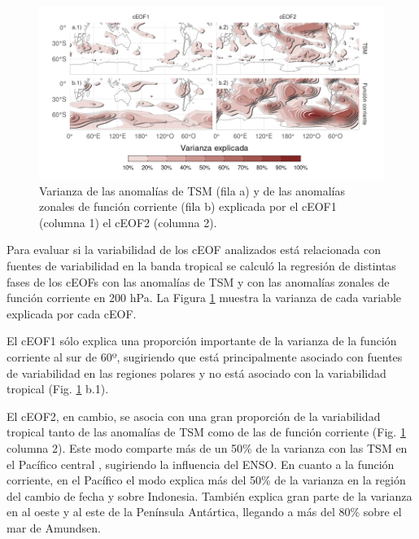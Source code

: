 \documentclass[12pt,oneside,a4paper]{reedthesis}
\begin{document}
\begin{figure}

{\centering \includegraphics{figures/20-ceofs/psi-sst-explained-variance-1} 

}

\caption{Varianza de las anomalías de TSM (fila a) y de las anomalías zonales de función corriente (fila b) explicada por el cEOF1 (columna 1) el cEOF2 (columna 2).}\label{fig:psi-sst-explained-variance}
\end{figure}

Para evaluar si la variabilidad de los cEOF analizados está relacionada con fuentes de variabilidad en la banda tropical se calculó la regresión de distintas fases de los cEOFs con las anomalías de TSM y con las anomalías zonales de función corriente en 200 hPa.
La Figura \ref{fig:psi-sst-explained-variance} muestra la varianza de cada variable explicada por cada cEOF.

El cEOF1 sólo explica una proporción importante de la varianza de la función corriente al sur de 60º, sugiriendo que está principalmente asociado con fuentes de variabilidad en las regiones polares y no está asociado con la variabilidad tropical (Fig. \ref{fig:psi-sst-explained-variance} b.1).

El cEOF2, en cambio, se asocia con una gran proporción de la variabilidad tropical tanto de las anomalías de TSM como de las de función corriente (Fig. \ref{fig:psi-sst-explained-variance} columna 2).
Este modo comparte más de un 50\% de la varianza con las TSM en el Pacífico central , sugiriendo la influencia del ENSO.
En cuanto a la función corriente, en el Pacífico el modo explica más del 50\% de la varianza en la región del cambio de fecha y sobre Indonesia.
También explica gran parte de la varianza en al oeste y al este de la Península Antártica, llegando a más del 80\% sobre el mar de Amundsen.
\end{document}

